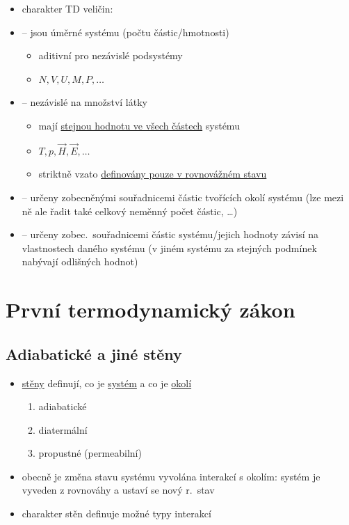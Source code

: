 \begin{itemize}
  \item charakter TD veličin:
\end{itemize}
\begin{itemize}[label=$\langle$,leftmargin=2.5em]
  \item {} -- jsou úměrné  systému (počtu částic/hmotnosti)
  \begin{itemize}[nosep]
    \item[--] aditivní pro nezávislé podsystémy
    \item[--] $N, V, U, M, P, \dots$
  \end{itemize}
  \item {} -- nezávislé na množství látky
  \begin{itemize}[nosep]
    \item[--] mají \underline{stejnou hodnotu ve všech částech} systému
    \item[--] $T, p, \vec H, \vec E, \dots$
    \item[--] striktně vzato \underline{definovány pouze v rovnovážném stavu}
  \end{itemize}
\end{itemize}
\begin{itemize}[label=$\langle$,leftmargin=2.5em]
  \item {} -- určeny zobecněnými souřadnicemi částic tvořících okolí systému (lze mezi ně ale řadit také celkový neměnný počet částic, \dots)
  \item {} -- určeny zobec.\ souřadnicemi částic systému/jejich hodnoty závisí na vlastnostech daného systému (v jiném systému za stejných podmínek nabývají odlišných hodnot)
\end{itemize}

\newpage
\section{První termodynamický zákon}

\subsection{Adiabatické a jiné stěny}
\begin{itemize}
  \item \underline{stěny} definují, co je \underline{systém} a co je \underline{okolí}
  \begin{enumerate}[label=\arabic*)]
    \item adiabatické
    \item diatermální
    \item propustné (permeabilní)
  \end{enumerate}
  \item obecně je změna stavu systému vyvolána interakcí s okolím: systém je vyveden z rovnováhy a ustaví se nový r.\ stav
  \item charakter stěn definuje možné typy interakcí
\end{itemize}

